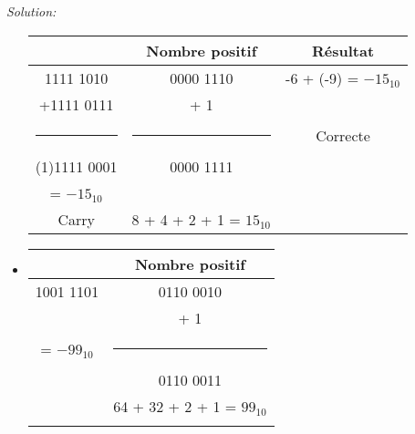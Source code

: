 \documentclass{article}
\newenvironment{solution}
    {\textit{Solution:}}
    {}
\begin{document}
\begin{solution}
\begin{itemize}
        \begin{tabular}{|c|c|c|}
        \hline
        & Nombre positif & Résultat \\
        \hline
        \hspace{6pt}1111 1010       &     0000 1110         &       -6 + (-9) = $-15_{10}$         \\
        +1111 0111                  &     + \hspace{25pt} 1               &                                         \\
        \rule{1in}{1pt}             &      \rule{1in}{1pt}            &       Correcte                          \\
        (1)1111 0001                &     0000 1111         &                                         \\
        \hspace{33pt} = $-15_{10}$ \hspace{30pt}  &       &                                   \\
        Carry                       &8 + 4 + 2 + 1 = $15_{10}$&      \hspace{100pt}                     \\
        \hline
        \end{tabular}
        
        
        
        
        \item
        
        
        \begin{tabular}{|c|c|}
        \hline
        & Nombre positif\\
        \hline    
        1001 1101           &       0110 0010                   \\
        \hspace{101pt}      &       + \hspace{25pt} 1           \\
        = $-99_{10}$         &       \rule{1in}{1pt}             \\
        \hspace{5pt}        &       0110 0011                   \\
        \hspace{5pt}        &       64 + 32 + 2 + 1 = $99_{10}$            \\
                            &       \hspace{100pt}              \\
        \hline
        \end{tabular}
        

\end{itemize}
\end{solution}
\end{document}
